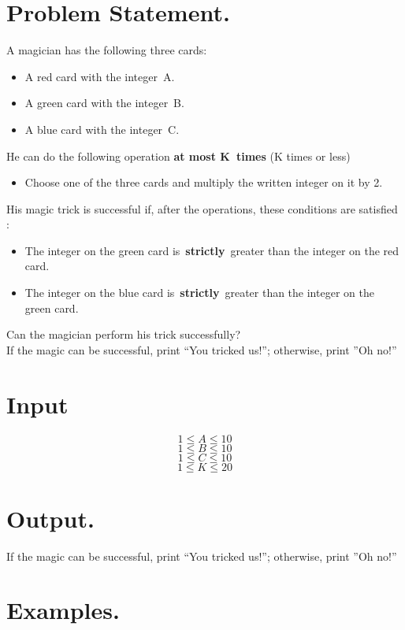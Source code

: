 \documentclass[10pt]{article}
\begin{document}
\section{Problem Statement.}
A magician has the following three cards:
\begin{itemize}
\item A red card with the integer A.
\item A green card with the integer B.
\item A blue card with the integer C.
\end{itemize}
He can do the following operation \textbf{at most K times} (K times or less)
\begin{itemize}
\item Choose one of the three cards and multiply the written integer on it by 2.
\end{itemize}
His magic trick is successful if, after the operations, these conditions are satisfied :
\begin{itemize}
\item The integer on the green card is \textbf{strictly} greater than the integer on the red card.
\item The integer on the blue card is \textbf{strictly} greater than the integer on the green card.
\end{itemize}
Can the magician perform his trick successfully?\\
If the magic can be successful, print “You tricked us!”; otherwise, print ”Oh no!”

\section{Input}
$$ 1\le A \le 10 $$
$$ 1\le B \le 10 $$
$$ 1\le C \le 10 $$
$$ 1\le K \le 20 $$
\section{Output.}
If the magic can be successful, print “You tricked us!”; otherwise, print ”Oh no!”
\section{Examples.}
\end{document}
